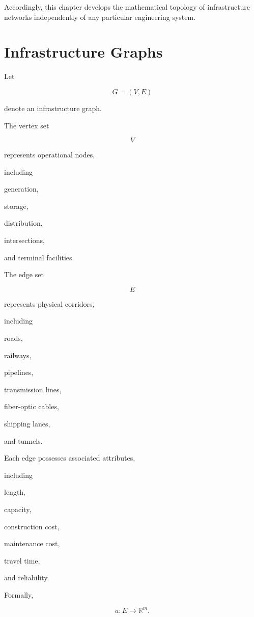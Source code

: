 \documentclass[11pt,fleqn]{book}
\numberwithin{equation}{chapter}
\theoremstyle{plain}
\theoremstyle{definition}
\theoremstyle{remark}
\begin{document}
Accordingly, this chapter develops the mathematical topology of
infrastructure networks independently of any particular engineering
system.


\section{Infrastructure Graphs}

Let

\[
G=(V,E)
\]

denote an infrastructure graph.

The vertex set

\[
V
\]

represents operational nodes,

including

generation,

storage,

distribution,

intersections,

and terminal facilities.

The edge set

\[
E
\]

represents physical corridors,

including

roads,

railways,

pipelines,

transmission lines,

fiber-optic cables,

shipping lanes,

and tunnels.


Each edge possesses associated attributes,

including

length,

capacity,

construction cost,

maintenance cost,

travel time,

and reliability.

Formally,

\[
a:E\rightarrow\mathbb R^m.
\]

\end{document}
